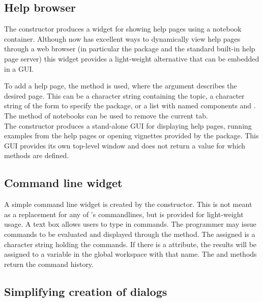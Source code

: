 \subsection{Help browser}
\label{sec:gWidgets-help-browser}

The  constructor produces a widget for showing help
pages using a notebook container. Although \R\/ now has excellent
ways to dynamically view help pages through a web browser (in
particular the  package and the standard built-in help
page server) this widget provides a light-weight alternative that can
be embedded in a GUI.

To add a help page, the  method is used,
where the  argument describes the desired page. This can
be a character string containing the topic, a character string of the
form  to specify the package, or a list with
named components  and .  The
 method of notebooks can be used to remove the
current tab.
\\

The  constructor produces a stand-alone
GUI for displaying help pages, running examples from the help pages or
opening vignettes provided by the package. This GUI provides its own
top-level window and does not return a value for which methods are defined.



\subsection{Command line widget}
\label{sec:gWidgets-command-line-widget}



A simple command line widget is created by the
 constructor. This is not meant as a
replacement for any of \R's commandlines, but is provided for
light-weight usage. A text box allows users to type in \R\/
commands. The programmer may issue commands to be evaluated and
displayed through the  method. The
 assigned is a character string holding the commands. If
there is a  attribute, the results will be assigned to a variable
in the global workspace with that name. The  and \code{[}
methods return the command history.

\subsection{Simplifying creation of dialogs}
\label{sec:gWidgets-designing-forms}

